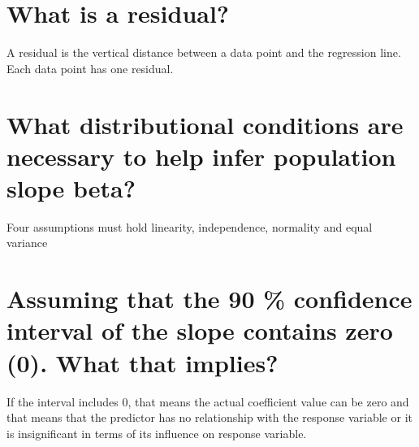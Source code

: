 \documentclass{article}
\begin{document}
\section{What is a residual?}

A residual is the vertical distance between a data point and the regression line. Each data point has one residual. 

\section{What distributional conditions are necessary to help infer population slope beta?}

Four assumptions must hold linearity, independence, normality and equal variance 

\section{Assuming that the 90 \% confidence interval of the slope contains zero (0). What that implies?}

If the interval includes 0, that means the actual coefficient value can be zero and that means that the predictor has no relationship with the response variable or it is insignificant in terms of its influence on response variable.
\end{document}
